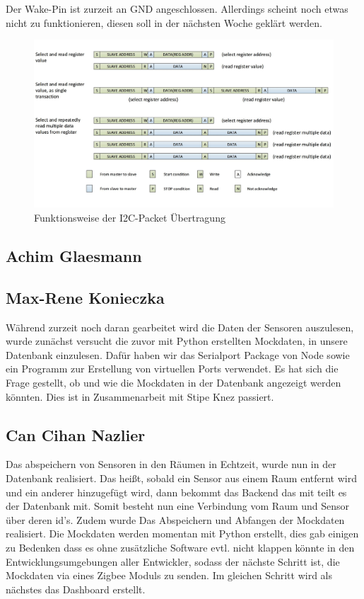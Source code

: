 \documentclass[]{article}
\begin{document}
Der Wake-Pin ist zurzeit an GND angeschlossen. Allerdings scheint noch etwas nicht zu funktionieren, diesen soll in der nächsten Woche geklärt werden. 
\begin{figure}[h]
	\centering
	\includegraphics[scale=0.30]{images/i2c_ccs811}
	\caption{Funktionsweise der I2C-Packet Übertragung\cite{datasheetcss811}}
	\label{img:I2C_ccs811}
\end{figure}


\subsection{Achim Glaesmann}

\subsection{Max-Rene Konieczka}
Während zurzeit noch daran gearbeitet wird die Daten der Sensoren auszulesen, wurde zunächst versucht die zuvor mit Python erstellten Mockdaten, in unsere Datenbank einzulesen. Dafür haben wir das Serialport Package von Node sowie ein Programm zur Erstellung von virtuellen Ports verwendet. Es hat sich die Frage gestellt, ob und wie die Mockdaten in der Datenbank angezeigt werden könnten. Dies ist in Zusammenarbeit mit Stipe Knez passiert.
\subsection{Can Cihan Nazlier}
Das abspeichern von Sensoren in den Räumen in Echtzeit, wurde nun in der Datenbank realisiert. Das heißt, sobald ein Sensor aus einem Raum entfernt wird und ein anderer hinzugefügt wird,
dann bekommt das Backend das mit teilt es der Datenbank mit. Somit besteht nun eine Verbindung vom Raum und Sensor über deren id's. Zudem wurde Das Abspeichern und Abfangen der Mockdaten realisiert.
Die Mockdaten werden momentan mit Python erstellt, dies gab einigen zu Bedenken dass es ohne zusätzliche Software evtl. nicht klappen könnte in den Entwicklungsumgebungen
aller Entwickler, sodass der nächste Schritt ist, die Mockdaten via eines Zigbee Moduls zu senden. Im gleichen Schritt wird als nächstes das Dashboard erstellt.

\printbibliography
\end{document}
